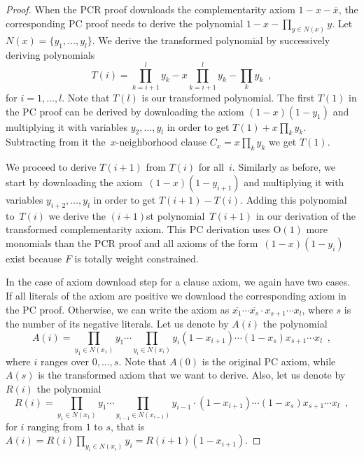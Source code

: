\documentclass[11pt]{article}
\numberwithin{equation}{section}
\theoremstyle{definition}
\theoremstyle{plain}
\theoremstyle{plain}
\theoremstyle{definition}
\newcommand{\bigoh}[1]{\mathrm{O} ( #1 )}
\newcommand{\set}[1]{\{ #1 \}}
\newcommand{\olnot}[1]{\overline{#1}}
\newcommand{\eqcomma}{\enspace ,}
\newcommand{\varweightconstrained}{totally weight constrained\xspace}
\newcommand{\varneighborhoodclause}[1]{$#1$-neighborhood clause}
\newcommand{\varneighbors}[1]{N(#1)}
\newcommand{\complementarityiter}[1]{T(#1)}
\newcommand{\negativeaxiomiter}[1]{A(#1)}
\newcommand{\remainingpoly}[1]{R(#1)}
\begin{document}
\begin{proof}
  When the PCR proof downloads the complementarity axiom $1 - x -
  \olnot{x}$, the corresponding PC proof needs to derive the
  polynomial $1 - x - \prod_{y \in \varneighbors{x}} y$. Let
  $\varneighbors{x} = \set{y_1, \ldots, y_l}$. We derive the
  transformed polynomial by successively deriving polynomials
  \begin{equation}
    \complementarityiter{i} = \prod_{k = i + 1}^l y_k - x \prod_{k = i + 1}^l y_k - \prod_k y_k \eqcomma
  \end{equation}
  for $i = 1, \ldots, l$. Note that $\complementarityiter{l}$ is our
  transformed polynomial. The first $\complementarityiter{1}$ in the
  PC proof can be derived by downloading the axiom $(1 - x)(1 - y_1)$
  and multiplying it with variables $y_2, \ldots, y_l$ in order to get
  $\complementarityiter{1} + x \prod_k y_k$. Subtracting from it
  the~\varneighborhoodclause{x} $C_x = x \prod_k y_k$ we get
  $\complementarityiter{1}$.


  We proceed to derive $\complementarityiter{i + 1}$ from
  $\complementarityiter{i}$ for all~$i$. Similarly as before, we start
  by downloading the axiom~$(1 - x)(1 - y_{i + 1})$ and multiplying it
  with variables $y_{i + 2}, \ldots, y_l$ in order to get
  $\complementarityiter{i + 1} - \complementarityiter{i}$. Adding this
  polynomial to~$\complementarityiter{i}$ we derive the $(i + 1)$st
  polynomial~$\complementarityiter{i + 1}$ in our derivation of the
  transformed complementarity axiom. This PC derivation uses
  $\bigoh{1}$ more monomials than the PCR proof and all axioms of the
  form~$(1 - x)(1 - y_i)$ exist because $F$ is
  \varweightconstrained{}.

  In the case of axiom download step for a clause axiom, we again have
  two cases. If all literals of the axiom are positive we download the
  corresponding axiom in the PC proof. Otherwise, we can write the
  axiom as $\olnot{x_1} \cdots \olnot{x_s} \cdot x_{s + 1} \cdots
  x_l$, where $s$ is the number of its negative literals.
  Let us denote by $\negativeaxiomiter{i}$
  the polynomial
  \begin{equation}
    \negativeaxiomiter{i} = \prod_{y_1 \in \varneighbors{x_1}} y_1 \cdots \prod_{y_i \in
      \varneighbors{x_i}} y_i (1 - x_{i + 1}) \cdots (1 - x_s) x_{s + 1} \cdots x_l \eqcomma
  \end{equation}
  where $i$ ranges over $0, \ldots, s$. Note that
  $\negativeaxiomiter{0}$ is the original PC axiom, while
  $\negativeaxiomiter{s}$ is the transformed axiom that we want to
  derive. Also, let us denote by $\remainingpoly{i}$ the polynomial
  \begin{equation}
    \remainingpoly{i} = \prod_{y_1 \in \varneighbors{x_1}} y_1 \cdots \prod_{y_{i - 1} \in \varneighbors{x_{i - 1}}} y_{i - 1} \cdot (1 - x_{i + 1}) \cdots (1 - x_s) x_{s + 1} \cdots x_l \eqcomma
  \end{equation}
  for $i$ ranging from $1$ to $s$, that is $\negativeaxiomiter{i} =
  \remainingpoly{i} \prod_{y_i \in \varneighbors{x_i}} y_i =
  \remainingpoly{i + 1} (1 - x_{i + 1})$.


\end{proof}
\end{document}

